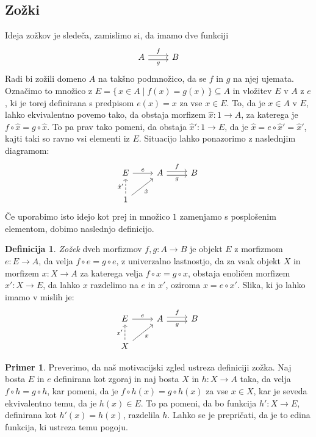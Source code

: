 \documentclass[12pt,a4paper]{book}
\theoremstyle{definition}
\newtheorem{definicija}{Definicija}[chapter]
\theoremstyle{plain}
\theoremstyle{definition}
\newtheorem{primer}{Primer}[section]
\theoremstyle{remark}
\renewcommand{\set}[1]{\{\,#1\,\}}
\begin{document}
\subsection{Zožki}
Ideja zožkov je sledeča, zamislimo si, da imamo dve funkciji
%
$$\begin{tikzcd}
A \ar[r, shift left, "f"] \ar[r, shift right, "g"'] & B 
\end{tikzcd}$$
%
Radi bi zožili domeno $A$ na takšno podmnožico, da se $f$ in $g$ na njej ujemata. Označimo to množico z $E = \set{x \in A \mid f(x) = g(x)} \subseteq A$ in vložitev $E$ v $A$ z $e$, ki je torej definirana s predpisom $e(x) = x$ za vse $x \in E$. To, da je $x \in A$ v $E$, lahko ekvivalentno povemo tako, da obstaja morfizem $\hat{x} : 1 \to A$, za katerega je $f \circ \hat{x} = g \circ \hat{x}$. To pa prav tako pomeni, da obstaja $\hat{x}' : 1 \to E$, da je $\hat{x} = e \circ \hat{x}' = \hat{x}'$, kajti taki so ravno vsi elementi iz $E$. Situacijo lahko ponazorimo z naslednjim diagramom:
$$\begin{tikzcd}
E \ar[r, "e"] & A \ar[r, shift left, "f"] \ar[r, shift right, "g"'] & B \\
1 \ar[u, dashed, "\hat{x}'"] \ar[ur, "\hat{x}"']
\end{tikzcd}$$
Če uporabimo isto idejo kot prej in množico $1$ zamenjamo s posplošenim elementom, dobimo naslednjo definicijo.

\begin{definicija}
\emph{Zožek} dveh morfizmov $f, g : A \to B$ je objekt $E$ z morfizmom $e : E \to A$, da velja $f \circ e = g \circ e$, z univerzalno lastnostjo, da za vsak objekt $X$ in morfizem $x : X \to A$ za katerega velja $f \circ x = g \circ x$, obstaja enoličen morfizem $x' : X \to E$, da lahko $x$ razdelimo na $e$ in $x'$, oziroma $x = e \circ x'$.
Slika, ki jo lahko imamo v mislih je:
$$\begin{tikzcd}
E \ar[r, "e"] & A \ar[r, shift left, "f"] \ar[r, shift right, "g"'] & B \\
X \ar[u, dashed, "x'"] \ar[ur, "x"']
\end{tikzcd}$$

\end{definicija}

\begin{primer} \label{konstrukcija zozkov v Set}
Preverimo, da naš motivacijski zgled ustreza definiciji zožka. Naj bosta $E$ in $e$ definirana kot zgoraj in naj bosta $X$ in $h:X \to A$ taka, da velja $f \circ h = g \circ h$, kar pomeni, da je $f \circ h(x) = g \circ  h(x)$ za vse $x \in X$, kar je seveda ekvivalentno temu, da je $h(x) \in E$. To pa pomeni, da bo funkcija $h' : X \to E$, definirana kot $h'(x) = h(x)$, razdelila $h$. Lahko se je prepričati, da je to edina funkcija, ki ustreza temu pogoju.
\end{primer}
\end{document}
